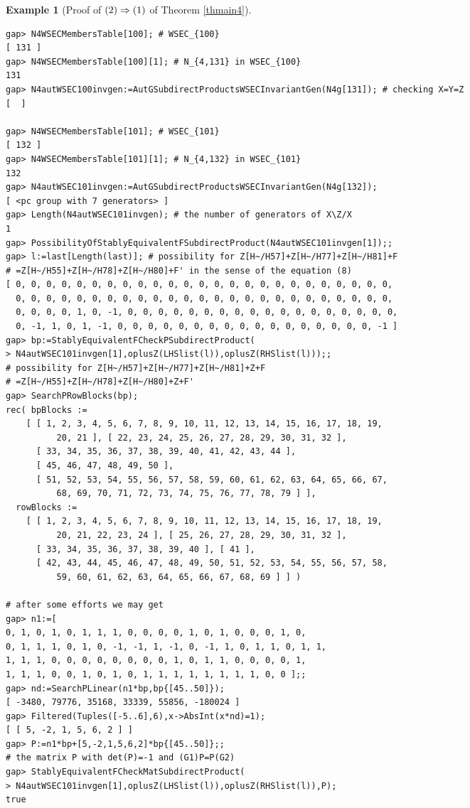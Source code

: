 \documentclass{amsart}
\theoremstyle{plain}
\theoremstyle{definition}
\newtheorem{example}[theorem]{Example}
\theoremstyle{remark}
\begin{document}
\begin{example}[Proof of ${\rm (2)}\Rightarrow {\rm (1)}$ of {Theorem \ref{thmain4}}]
\begin{verbatim}
gap> N4WSECMembersTable[100]; # WSEC_{100}
[ 131 ]
gap> N4WSECMembersTable[100][1]; # N_{4,131} in WSEC_{100}
131
gap> N4autWSEC100invgen:=AutGSubdirectProductsWSECInvariantGen(N4g[131]); # checking X=Y=Z
[  ]

gap> N4WSECMembersTable[101]; # WSEC_{101}
[ 132 ]
gap> N4WSECMembersTable[101][1]; # N_{4,132} in WSEC_{101}
132
gap> N4autWSEC101invgen:=AutGSubdirectProductsWSECInvariantGen(N4g[132]);
[ <pc group with 7 generators> ]
gap> Length(N4autWSEC101invgen); # the number of generators of X\Z/X
1
gap> PossibilityOfStablyEquivalentFSubdirectProduct(N4autWSEC101invgen[1]);;
gap> l:=last[Length(last)]; # possibility for Z[H~/H57]+Z[H~/H77]+Z[H~/H81]+F
# =Z[H~/H55]+Z[H~/H78]+Z[H~/H80]+F' in the sense of the equation (8)
[ 0, 0, 0, 0, 0, 0, 0, 0, 0, 0, 0, 0, 0, 0, 0, 0, 0, 0, 0, 0, 0, 0, 0, 0, 0, 
  0, 0, 0, 0, 0, 0, 0, 0, 0, 0, 0, 0, 0, 0, 0, 0, 0, 0, 0, 0, 0, 0, 0, 0, 0, 
  0, 0, 0, 0, 1, 0, -1, 0, 0, 0, 0, 0, 0, 0, 0, 0, 0, 0, 0, 0, 0, 0, 0, 0, 0, 
  0, -1, 1, 0, 1, -1, 0, 0, 0, 0, 0, 0, 0, 0, 0, 0, 0, 0, 0, 0, 0, 0, 0, -1 ]
gap> bp:=StablyEquivalentFCheckPSubdirectProduct(
> N4autWSEC101invgen[1],oplusZ(LHSlist(l)),oplusZ(RHSlist(l)));;
# possibility for Z[H~/H57]+Z[H~/H77]+Z[H~/H81]+Z+F
# =Z[H~/H55]+Z[H~/H78]+Z[H~/H80]+Z+F' 
gap> SearchPRowBlocks(bp);
rec( bpBlocks := 
    [ [ 1, 2, 3, 4, 5, 6, 7, 8, 9, 10, 11, 12, 13, 14, 15, 16, 17, 18, 19, 
          20, 21 ], [ 22, 23, 24, 25, 26, 27, 28, 29, 30, 31, 32 ], 
      [ 33, 34, 35, 36, 37, 38, 39, 40, 41, 42, 43, 44 ], 
      [ 45, 46, 47, 48, 49, 50 ], 
      [ 51, 52, 53, 54, 55, 56, 57, 58, 59, 60, 61, 62, 63, 64, 65, 66, 67, 
          68, 69, 70, 71, 72, 73, 74, 75, 76, 77, 78, 79 ] ], 
  rowBlocks := 
    [ [ 1, 2, 3, 4, 5, 6, 7, 8, 9, 10, 11, 12, 13, 14, 15, 16, 17, 18, 19, 
          20, 21, 22, 23, 24 ], [ 25, 26, 27, 28, 29, 30, 31, 32 ], 
      [ 33, 34, 35, 36, 37, 38, 39, 40 ], [ 41 ], 
      [ 42, 43, 44, 45, 46, 47, 48, 49, 50, 51, 52, 53, 54, 55, 56, 57, 58, 
          59, 60, 61, 62, 63, 64, 65, 66, 67, 68, 69 ] ] )

# after some efforts we may get 
gap> n1:=[ 
0, 1, 0, 1, 0, 1, 1, 1, 0, 0, 0, 0, 1, 0, 1, 0, 0, 0, 1, 0, 
0, 1, 1, 1, 0, 1, 0, -1, -1, 1, -1, 0, -1, 1, 0, 1, 1, 0, 1, 1, 
1, 1, 1, 0, 0, 0, 0, 0, 0, 0, 0, 1, 0, 1, 1, 0, 0, 0, 0, 1, 
1, 1, 1, 0, 0, 1, 0, 1, 0, 1, 1, 1, 1, 1, 1, 1, 1, 0, 0 ];;
gap> nd:=SearchPLinear(n1*bp,bp{[45..50]});
[ -3480, 79776, 35168, 33339, 55856, -180024 ]
gap> Filtered(Tuples([-5..6],6),x->AbsInt(x*nd)=1);
[ [ 5, -2, 1, 5, 6, 2 ] ]
gap> P:=n1*bp+[5,-2,1,5,6,2]*bp{[45..50]};; 
# the matrix P with det(P)=-1 and (G1)P=P(G2)
gap> StablyEquivalentFCheckMatSubdirectProduct(
> N4autWSEC101invgen[1],oplusZ(LHSlist(l)),oplusZ(RHSlist(l)),P);
true


\end{verbatim}
\end{example}
\end{document}
